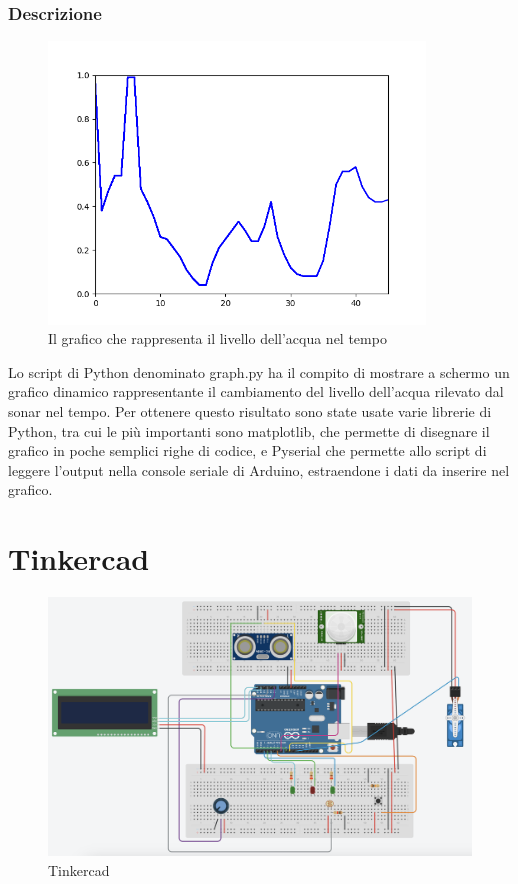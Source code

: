 \documentclass[a4paper,12pt]{report}
\begin{document}
\subsection{Descrizione}
\begin{figure}[H]
    \centering
    \includegraphics[width=10cm]{graph.png}
    \caption{Il grafico che rappresenta il livello dell'acqua nel tempo}
\end{figure}
\par
Lo script di Python denominato graph.py ha il compito di mostrare a schermo un grafico dinamico rappresentante il cambiamento del livello dell'acqua rilevato dal sonar nel tempo. Per ottenere questo risultato sono state usate varie librerie di Python, tra cui le più importanti sono  matplotlib, che permette di disegnare il grafico in poche semplici righe di codice, e Pyserial che permette allo script di leggere l'output nella console seriale di Arduino, estraendone i dati da inserire nel grafico.

\chapter {Tinkercad}
\begin{figure}[H]
    \centering
    \includegraphics[width=15cm]{Screenshot 2022-11-30 alle 23.05.18.png}
    \caption{Tinkercad}
\end{figure}
\end{document}
